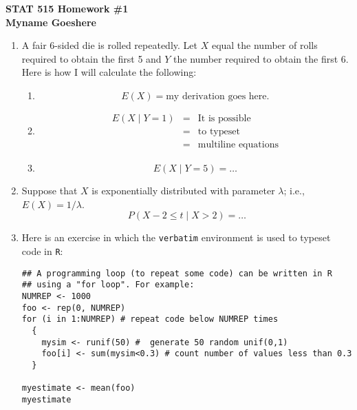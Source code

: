 \documentclass{article}
\begin{document}
\begin{center}
{\bf STAT 515  Homework \#1 \\ Myname Goeshere}
\end{center}

\begin{enumerate} %

\item A fair 6-sided die is rolled repeatedly.  Let $X$ equal the number of rolls required to
obtain the first 5 and $Y$ the number required to obtain the first 6. 
Here is how I will calculate the following:

  \begin{enumerate} %
  \item 
  \[ %
  E(X) = \mbox{my derivation goes here.} %
  \]
  \item 
  \begin{eqnarray*}
  E(X \mid Y=1) &=& \mbox{It is possible} \\
  &=& \mbox{to typeset} \\
  &=& \mbox{multiline equations}
  \end{eqnarray*}
  \item \[ E(X \mid Y=5) = \ldots\]
  \end{enumerate}

\item Suppose that $X$ is exponentially distributed with parameter $\lambda$; i.e., 
$E(X)=1/\lambda$.  
\[
P(X-2 \le t\mid X>2) = \ldots
\]



\item Here is an exercise in which the {\tt verbatim} environment is used to typeset 
code in {\tt R}:
\begin{verbatim}
## A programming loop (to repeat some code) can be written in R 
## using a "for loop". For example:
NUMREP <- 1000
foo <- rep(0, NUMREP)
for (i in 1:NUMREP) # repeat code below NUMREP times
  {
    mysim <- runif(50) #  generate 50 random unif(0,1)
    foo[i] <- sum(mysim<0.3) # count number of values less than 0.3
  }

myestimate <- mean(foo) 
myestimate
\end{verbatim}


\end{enumerate}
\end{document}
